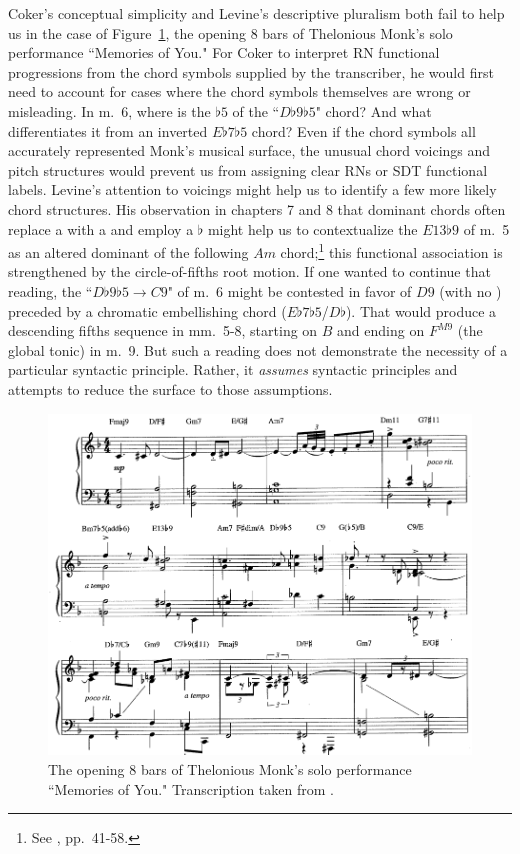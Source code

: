 Coker's conceptual simplicity and Levine's descriptive pluralism both fail to help us in the case of Figure~\ref{monk}, the opening 8 bars of Thelonious Monk's solo performance ``Memories of You."  For Coker to interpret RN functional progressions from the chord symbols supplied by the transcriber, he would first need to account for cases where the chord symbols themselves are wrong or misleading.  In m.\ 6, where is the $\flat 5$ of the ``$D\flat 9\flat 5$" chord?  And what differentiates it from an inverted $E\flat 7\flat 5$ chord?  Even if the chord symbols all accurately represented Monk's musical surface, the unusual chord voicings and pitch structures would prevent us from assigning clear RNs or SDT functional labels.  Levine's attention to voicings might help us to identify a few more likely chord structures.  His observation in chapters 7 and 8 that dominant chords often replace a  with a  and employ a $\flat$ might help us to contextualize the $E13\flat 9$ of m.\ 5 as an altered dominant of the following $Am$ chord;\footnote{See \cite{levine1989}, pp.\ 41-58.} this functional association is strengthened by the circle-of-fifths root motion.  If one wanted to continue that reading, the ``$D\flat 9 \flat 5 \rightarrow C9$" of m.\ 6 might be contested in favor of $D9$ (with no ) preceded by a chromatic embellishing chord ($E\flat 7 \flat 5$/$D\flat$). That would produce a descending fifths sequence in mm.\ 5-8, starting on $B$ and ending on $F^{M9}$ (the global tonic) in m.\ 9.   But such a reading does not demonstrate the necessity of a particular syntactic principle.  Rather, it \emph{assumes} syntactic principles and attempts to reduce the surface to those assumptions.
\begin{figure}
	\centering
	\caption{The opening 8 bars of Thelonious Monk's solo performance ``Memories of You."  Transcription taken from \cite{monkStandards}.}
	\label{monk}
	\includegraphics[width=6in]{diss_prospectus_monk.png}
\end{figure}

